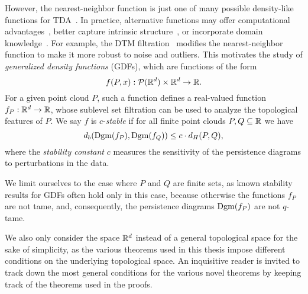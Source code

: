 However, the nearest-neighbor function is just one of many possible density-like
functions for
TDA~\cite{anai2020dtm,hoefgeest2022christoffeldarbouxkerneltopologicaldata,phillips2015geometricinferencekerneldensity}.
In practice, alternative functions may offer computational
advantages~\cite{guibas2011witnessed,buchet2014efficientrobustpersistenthomology},
better capture intrinsic structure~\cite{anai2020dtm}, or incorporate domain
knowledge~\cite{fractalfract8120731}. For example, the DTM
filtration~\cite{anai2020dtm} modifies the nearest-neighbor function to make
it more robust to noise and outliers. This motivates the study of
\emph{generalized density functions} (GDFs), which are functions of the form
\begin{equation}
    f(P, x) : \mathcal{P}(\mathbb{R}^d) \times \mathbb{R}^d \to \mathbb{R}.
\end{equation}
For a given point cloud $P$, such a function defines a real-valued function
$f_P: \mathbb{R}^d \to \mathbb{R}$, whose sublevel set filtration can be used to analyze the
topological features of $P$. We say $f$ is $c$-\emph{stable} if for all finite
point clouds $P, Q \subseteq \mathbb{R}$ we have
\begin{equation}
    d_b(\operatorname{Dgm}(f_P), \operatorname{Dgm}(f_Q)) \leq c \cdot d_H(P, Q),
\end{equation}
where the \emph{stability constant} $c$ measures the sensitivity of the
persistence diagrams to perturbations in the data.

We limit ourselves to the case where $P$ and $Q$ are finite sets, as known
stability results for GDFs often hold only in this case, because otherwise the
functions $f_P$ are not tame, and, consequently, the persistence diagrams
$\operatorname{Dgm}(f_P)$ are not $q$-tame.

We also only consider the space $\mathbb{R}^d$ instead of a general topological space
for the sake of simplicity, as the various theorems used in this thesis impose
different conditions on the underlying topological space. An inquisitive reader
is invited to track down the most general conditions for the various novel
theorems by keeping track of the theorems used in the proofs.

